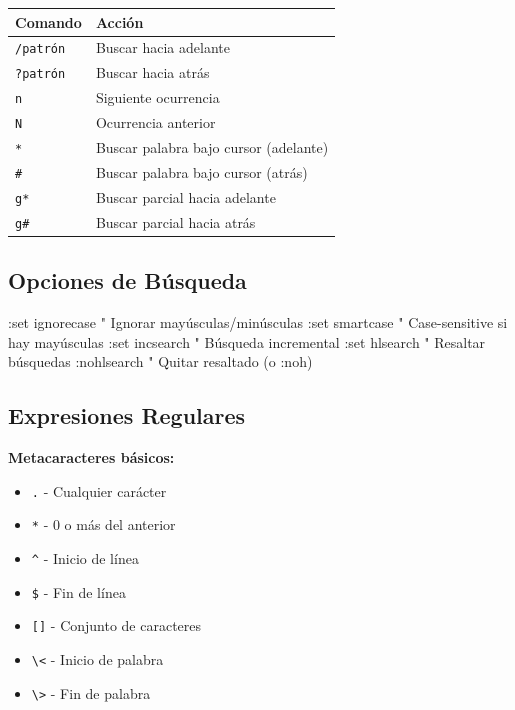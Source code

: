 \documentclass[
  doc,
  floatsintext,
  longtable,
  a4paper,
  nolmodern,
  notxfonts,
  notimes,
  12pt,
  colorlinks=true,linkcolor=blue,citecolor=blue,urlcolor=blue]{apa7}
\newenvironment{Shaded}{\begin{snugshade}}{\end{snugshade}}
\newcommand{\NormalTok}[1]{\textcolor[rgb]{0.00,0.23,0.31}{#1}}
\providecommand{\tightlist}{%
  \setlength{\itemsep}{0pt}\setlength{\parskip}{0pt}}
\newcounter{none} %
\begin{document}
{\def\LTcaptype{none} %
\begin{longtable}[]{@{}ll@{}}
\toprule\noalign{}
Comando & Acción \\
\midrule\noalign{}
\endhead
\bottomrule\noalign{}
\endlastfoot
\texttt{/patrón} & Buscar hacia adelante \\
\texttt{?patrón} & Buscar hacia atrás \\
\texttt{n} & Siguiente ocurrencia \\
\texttt{N} & Ocurrencia anterior \\
\texttt{*} & Buscar palabra bajo cursor (adelante) \\
\texttt{\#} & Buscar palabra bajo cursor (atrás) \\
\texttt{g*} & Buscar parcial hacia adelante \\
\texttt{g\#} & Buscar parcial hacia atrás \\
\end{longtable}
}

\subsection{Opciones de Búsqueda}\label{opciones-de-buxfasqueda}

\begin{Shaded}
\begin{Highlighting}[]
\NormalTok{:set ignorecase   " Ignorar mayúsculas/minúsculas}
\NormalTok{:set smartcase    " Case{-}sensitive si hay mayúsculas}
\NormalTok{:set incsearch    " Búsqueda incremental}
\NormalTok{:set hlsearch     " Resaltar búsquedas}
\NormalTok{:nohlsearch       " Quitar resaltado (o :noh)}
\end{Highlighting}
\end{Shaded}

\subsection{Expresiones Regulares}\label{expresiones-regulares}

\textbf{Metacaracteres básicos:}

\begin{itemize}
\tightlist
\item
  \texttt{.} - Cualquier carácter
\item
  \texttt{*} - 0 o más del anterior
\item
  \texttt{\^{}} - Inicio de línea
\item
  \texttt{\$} - Fin de línea
\item
  \texttt{{[}{]}} - Conjunto de caracteres
\item
  \texttt{\textbackslash{}\textless{}} - Inicio de palabra
\item
  \texttt{\textbackslash{}\textgreater{}} - Fin de palabra
\end{itemize}
\end{document}
